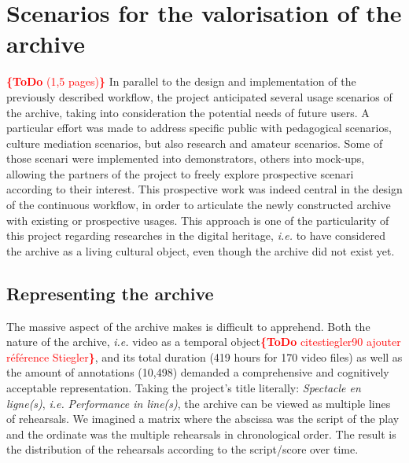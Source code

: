 \documentclass[conference]{IEEEtran}
\newcommand{\todo}[1]{\noindent\textcolor{red}{{\bf \{ToDo} #1{\bf \}}}}
\begin{document}
\section{Scenarios for the valorisation of the archive}
\label{sec:scenarios}
\todo{(1,5 pages)}
In parallel to the design and implementation of the previously described workflow, the project anticipated several usage scenarios of the archive, taking into consideration the potential needs of future users. A particular effort was made to address specific public with pedagogical scenarios, culture mediation scenarios, but also research and amateur scenarios. Some of those scenari were implemented into demonstrators, others into mock-ups, allowing the partners of the project to freely explore prospective scenari according to their interest.
This prospective work was indeed central in the design of the continuous workflow, in order to articulate the newly constructed archive with existing or prospective usages. This approach is one of the particularity of this project regarding researches in the digital heritage, {\it i.e.} to have considered the archive as a living cultural object, even though the archive did not exist yet.

\subsection{Representing the archive}
The massive aspect of the archive makes is difficult to apprehend. Both the nature of the archive, {\it i.e.} video as a temporal object\todo{cite{stiegler90} ajouter référence Stiegler}, and its total duration (419 hours for 170 video files) as well as the amount of annotations (10,498) demanded a comprehensive and cognitively acceptable representation. Taking the project's title literally: \emph{Spectacle en ligne(s)}, {\it i.e.} \emph{Performance in line(s)}, the archive can be viewed as multiple lines of rehearsals. We imagined a matrix where the abscissa was the script of the play and the ordinate was the multiple rehearsals in chronological order. The result is the distribution of the rehearsals according to the script/score over time.
\end{document}
